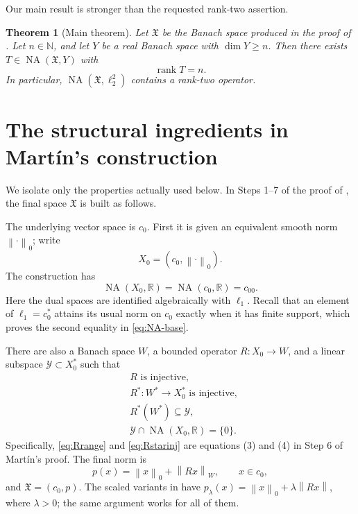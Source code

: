 \documentclass[11pt]{article}
\newtheorem{theorem}{Theorem}[section]
\theoremstyle{definition}
\newcommand{\NA}{\operatorname{NA}}
\newcommand{\rank}{\operatorname{rank}}
\newcommand{\R}{\mathbb R}
\newcommand{\X}{\mathfrak X}
\newcommand{\Xzero}{X_0}
\newcommand{\Yop}{\mathscr Y}
\newcommand{\norm}[1]{\left\lVert #1\right\rVert}
\begin{document}
Our main result is stronger than the requested rank-two assertion.

\begin{theorem}[Main theorem]\label{thm:main}
Let \(\X\) be the Banach space produced in the proof of
\cite[Theorem 1]{Martin2025}.  Let \(n\in\mathbb N\), and let \(Y\) be a real
Banach space with \(\dim Y\geq n\).  Then there exists
\(T\in\NA(\X,Y)\) with
\[
             \rank T=n.
\]
In particular, \(\NA(\X,\ell_2^2)\) contains a rank-two operator.
\end{theorem}

\section{The structural ingredients in Mart\'in's construction}

We isolate only the properties actually used below.  In Steps 1--7 of the
proof of \cite[Theorem 1]{Martin2025}, the final space \(\X\) is built as
follows.

The underlying vector space is \(c_0\).  First it is given an equivalent
smooth norm \(\norm{\cdot}_0\); write
\[
             \Xzero=(c_0,\norm{\cdot}_0).
\]
The construction has
\begin{equation}\label{eq:NA-base}
       \NA(\Xzero,\R)=\NA(c_0,\R)=c_{00}.
\end{equation}
Here the dual spaces are identified algebraically with \(\ell_1\).  Recall
that an element of \(\ell_1=c_0^*\) attains its usual norm on \(c_0\) exactly
when it has finite support, which proves the second equality in
\eqref{eq:NA-base}.

There are also a Banach space \(W\), a bounded operator
\(R:\Xzero\to W\), and a linear subspace \(\Yop\subset \Xzero^*\) such that
\begin{align}
       &R \text{ is injective},                                      \label{eq:Rinj}\\
       &R^*:W^*\longrightarrow \Xzero^* \text{ is injective},         \label{eq:Rstarinj}\\
       &R^*(W^*)\subseteq \Yop,                                      \label{eq:Rrange}\\
       &\Yop\cap\NA(\Xzero,\R)=\{0\}.                               \label{eq:separation}
\end{align}
Specifically, \eqref{eq:Rrange} and \eqref{eq:Rstarinj} are equations (3)
and (4) in Step 6 of Mart\'in's proof.  The final norm is
\begin{equation}\label{eq:final-norm}
              p(x)=\norm{x}_0+\norm{Rx}_W,
              \qquad x\in c_0,
\end{equation}
and \(\X=(c_0,p)\).  The scaled variants in
\cite[Remark 2]{Martin2025} have
\(p_\lambda(x)=\norm{x}_0+\lambda\norm{Rx}\), where \(\lambda>0\); the same
argument works for all of them.
\end{document}
